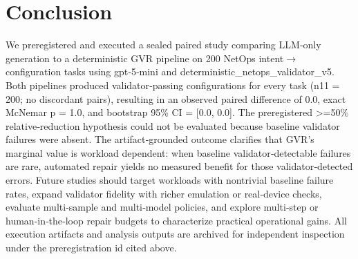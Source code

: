 \documentclass[conference]{IEEEtran}
\begin{document}
\section{Conclusion}
We preregistered and executed a sealed paired study comparing LLM‑only generation to a deterministic GVR pipeline on 200 NetOps intent\ensuremath{\rightarrow}configuration tasks using gpt‑5‑mini and deterministic\_netops\_validator\_v5. Both pipelines produced validator‑passing configurations for every task (n11 = 200; no discordant pairs), resulting in an observed paired difference of 0.0, exact McNemar p = 1.0, and bootstrap 95\% CI = [0.0, 0.0]. The preregistered >=50\% relative‑reduction hypothesis could not be evaluated because baseline validator failures were absent. The artifact‑grounded outcome clarifies that GVR's marginal value is workload dependent: when baseline validator‑detectable failures are rare, automated repair yields no measured benefit for those validator‑detected errors. Future studies should target workloads with nontrivial baseline failure rates, expand validator fidelity with richer emulation or real‑device checks, evaluate multi‑sample and multi‑model policies, and explore multi‑step or human‑in‑the‑loop repair budgets to characterize practical operational gains. All execution artifacts and analysis outputs are archived for independent inspection under the preregistration id cited above.
\end{document}
